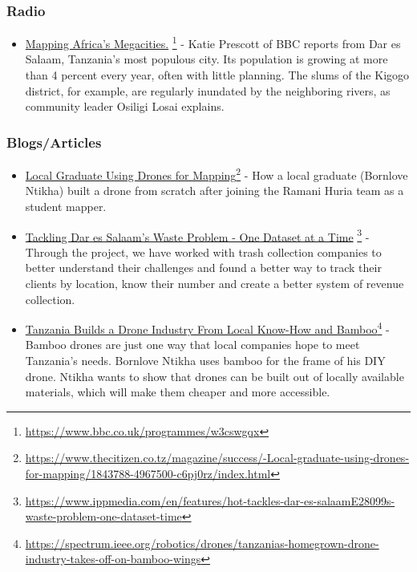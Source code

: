 \documentclass[a4paper,12pt,twoside]{article}
\begin{document}
\subsubsection{Radio}
\begin{itemize}
    \item \href{https://www.bbc.co.uk/programmes/w3cswgqx}{Mapping Africa's Megacities.} \footnote{\url{https://www.bbc.co.uk/programmes/w3cswgqx}}
- Katie Prescott of BBC reports from Dar es Salaam, Tanzania's most populous city. Its population is growing at more than 4 percent every year, often with little planning. The slums of the  Kigogo district, for example, are regularly inundated by the neighboring rivers, as community leader Osiligi Losai explains.
\end{itemize}

\subsubsection {Blogs/Articles}

\begin{itemize}
    \item \href{https://www.thecitizen.co.tz/magazine/success/-Local-graduate-using-drones-for-mapping/1843788-4967500-c6pj0rz/index.html}{Local Graduate Using Drones for Mapping}\footnote{\url{https://www.thecitizen.co.tz/magazine/success/-Local-graduate-using-drones-for-mapping/1843788-4967500-c6pj0rz/index.html}}
- How a local graduate (Bornlove Ntikha) built a drone from scratch after joining the Ramani Huria team as a student mapper.
    \item \href{https://www.ippmedia.com/en/features/hot-tackles-dar-es-salaamE28099s-waste-problem-one-dataset-time}{Tackling Dar es Salaam’s Waste Problem - One Dataset at a Time} \footnote{\url{https://www.ippmedia.com/en/features/hot-tackles-dar-es-salaamE28099s-waste-problem-one-dataset-time}}
- Through the project, we have worked with trash collection companies to better understand their challenges and found a better way to track their clients by location, know their number and create a better system of revenue collection.
    \item \href{https://spectrum.ieee.org/robotics/drones/tanzanias-homegrown-drone-industry-takes-off-on-bamboo-wings}{ Tanzania Builds a Drone Industry From Local Know-How and Bamboo}\footnote{\url{https://spectrum.ieee.org/robotics/drones/tanzanias-homegrown-drone-industry-takes-off-on-bamboo-wings}}
- Bamboo drones are just one way that local companies hope to meet Tanzania’s needs. Bornlove Ntikha uses bamboo for the frame of his DIY drone. Ntikha wants to show that drones can be built out of locally available materials, which will make them cheaper and more accessible.
\end{itemize}
\end{document}
